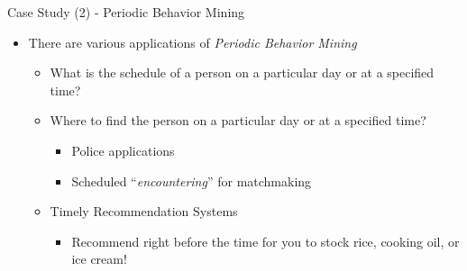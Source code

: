 \begin{slide}[toc=,bm=]{Case Study (2) - Periodic Behavior Mining}

\begin{itemize}
\item
There are various applications of \textit{Periodic Behavior Mining}

    \begin{itemize}
    \item
    What is the schedule of a person on a particular day or at a specified time?

    \item
    Where to find the person on a particular day or at a specified time?
        \begin{itemize}
        \item
        Police applications

        \item
        Scheduled ``\textit{encountering}'' for matchmaking
        \end{itemize}
    \item
    Timely Recommendation Systems
        \begin{itemize}
        \item
        Recommend right before the time for you to stock rice, cooking oil, or ice cream!
        \end{itemize}

\end{itemize}
\end{itemize}

\end{slide}


%
%
%
%



